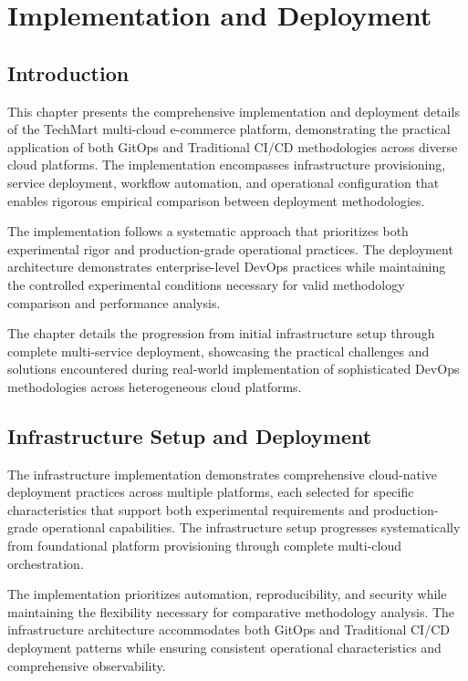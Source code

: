 \chapter{Implementation and Deployment}

\section{Introduction}

This chapter presents the comprehensive implementation and deployment details of the TechMart multi-cloud e-commerce platform, demonstrating the practical application of both GitOps and Traditional CI/CD methodologies across diverse cloud platforms. The implementation encompasses infrastructure provisioning, service deployment, workflow automation, and operational configuration that enables rigorous empirical comparison between deployment methodologies.

The implementation follows a systematic approach that prioritizes both experimental rigor and production-grade operational practices. The deployment architecture demonstrates enterprise-level DevOps practices while maintaining the controlled experimental conditions necessary for valid methodology comparison and performance analysis.

The chapter details the progression from initial infrastructure setup through complete multi-service deployment, showcasing the practical challenges and solutions encountered during real-world implementation of sophisticated DevOps methodologies across heterogeneous cloud platforms.

\section{Infrastructure Setup and Deployment}

The infrastructure implementation demonstrates comprehensive cloud-native deployment practices across multiple platforms, each selected for specific characteristics that support both experimental requirements and production-grade operational capabilities. The infrastructure setup progresses systematically from foundational platform provisioning through complete multi-cloud orchestration.

The implementation prioritizes automation, reproducibility, and security while maintaining the flexibility necessary for comparative methodology analysis. The infrastructure architecture accommodates both GitOps and Traditional CI/CD deployment patterns while ensuring consistent operational characteristics and comprehensive observability.

